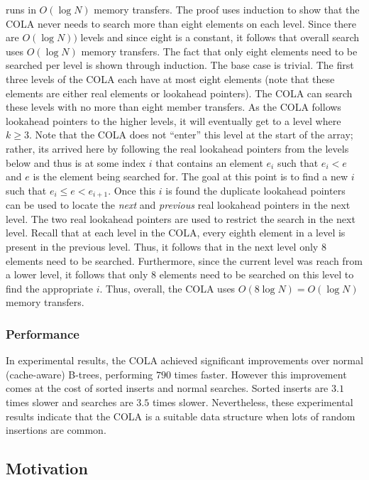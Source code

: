 \documentclass[preprint]{style}
\begin{document}
\Search{} runs in $O(\log N)$ memory transfers. The proof uses induction to
show that the COLA never needs to search more than eight elements on each
level. Since there are $O(\log N))$ levels and since eight is a constant, it
follows that overall search uses $O(\log N)$ memory transfers. The fact that
only eight elements need to be searched per level is shown through induction.
The base case is trivial. The first three levels of the COLA each have at most
eight elements (note that these elements are either real elements or
lookahead pointers). The COLA can search these levels with no more
than eight member transfers. As the COLA follows lookahead pointers to the
higher levels, it will eventually get to a level where $k \geq 3$. Note that
the COLA does not ``enter'' this level at the start of the array; rather, its
arrived here by following the real lookahead pointers from the levels below
and thus is at some index $i$ that contains an element $e_i$ such that $e_i <
e$ and $e$ is the element being searched for. The goal at this point is to
find a new $i$ such that $e_i \leq e < e_{i+1}$. Once this $i$ is found the
duplicate lookahead pointers can be used to locate the \textit{next} and
\textit{previous} real lookahead pointers in the next level. The two real lookahead
pointers are used to restrict the search in the next level. Recall that at
each level in the COLA, every eighth element in a level is present in the
previous level. Thus, it follows that in the next level only 8 elements need
to be searched. Furthermore, since the current level was reach from a lower
level, it follows that only 8 elements need to be searched on this level to
find the appropriate $i$. Thus, overall, the COLA uses $O(8\log{N}) =
O(\log{N})$ memory transfers.

\subsubsection{Performance}

In experimental results, the COLA achieved significant improvements over
normal (cache-aware) B-trees, performing $790$ times faster. However this
improvement comes at the cost of sorted inserts and normal searches. Sorted
inserts are $3.1$ times slower and searches are $3.5$ times slower. Nevertheless,
these experimental results indicate that the COLA is a suitable data
structure when lots of random insertions are common.

\subsection{Motivation}
\end{document}

